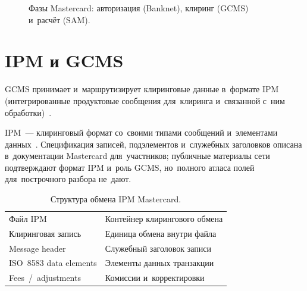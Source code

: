 
\begin{figure}[htbp]
  \centering
  \caption{Фазы Mastercard: авторизация (Banknet), клиринг (GCMS) и~расчёт (SAM).}\label{fig:auth-vs-gcms}
\end{figure}
\FloatBarrier

\section{IPM и GCMS}\label{sec:mc-ipm}

GCMS принимает и~маршрутизирует клиринговые данные в~формате IPM
(интегрированные продуктовые сообщения для~клиринга и~связанной с~ним
обработки)~\cite{mc-switching-services}.

IPM~--- клиринговый формат со~своими типами сообщений и~элементами
данных~\cite{mc-chargeback-guide}. Спецификация записей, подэлементов
и~служебных заголовков описана в~документации Mastercard для~участников;
публичные материалы сети подтверждают формат IPM и~роль GCMS, но~полного
атласа полей для~построчного разбора не~дают.

\begin{table}[H]
  \caption{Структура обмена IPM Mastercard.}\label{tab:mc-ipm-structure}
  \begingroup
  \tablesetup
  \begin{tabularx}{0.66\textwidth}{
      @{}P{0.26\textwidth}
      Y@{}
    }
    \toprule
    \headrow
     &  \\
    \midrule
    Файл IPM & Контейнер клирингового обмена \\
    \rowsep
    Клиринговая запись & Единица обмена внутри файла \\
    \rowsep
    Message header & Служебный заголовок записи \\
    \rowsep
    ISO~8583 data elements & Элементы данных транзакции \\
    \rowsep
    Fees~/~adjustments & Комиссии и~корректировки \\
    \bottomrule
  \end{tabularx}\par
  \endgroup
\end{table}


